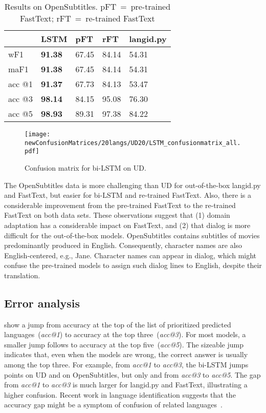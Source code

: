 \documentclass[11pt,a4paper]{article}
\newcommand{\fasttext}{FastText\xspace}
\newcommand{\langidpy}{langid.py\xspace}
\begin{document}
\begin{table}
    \begin{tabular}{|l|l|l|l|l|}
        \hline
        & \textbf{LSTM} & \textbf{pFT} & \textbf{rFT} & \textbf{\langidpy}\\ \hline
        wF1    & \textbf{91.38} & 67.45 & 84.14 & 54.31 \\ \hline
        maF1   & \textbf{91.38} & 67.45 & 84.14 & 54.31 \\ \hline
        acc @1 & \textbf{91.37} & 67.73 & 84.13 & 53.47 \\ \hline
        acc @3 & \textbf{98.14} & 84.15 & 95.08 & 76.30 \\ \hline
        acc @5 & \textbf{98.93} & 89.31 & 97.38 & 84.22 \\ \hline
    \end{tabular}
    \caption{Results on OpenSubtitles. pFT~=~pre-trained \fasttext; rFT~=~re-trained \fasttext}
    \label{tab:os20}
\end{table}


\begin{figure*}
    \centering
    \texttt{[image: newConfusionMatrices/20langs/UD20/LSTM\_confusionmatrix\_all.pdf]}
    \caption{Confusion matrix for bi-LSTM on UD.}
    \label{fig:conf_ud20_bilstm}
\end{figure*}

The OpenSubtitles data is more challenging than UD for out-of-the-box \langidpy and \fasttext, but easier for bi-LSTM and re-trained \fasttext. Also, there is a considerable improvement from the pre-trained \fasttext to the re-trained \fasttext on both data sets. These observations suggest that (1) domain adaptation has a considerable impact on \fasttext, and (2) that dialog is more difficult for the out-of-the-box models. OpenSubtitles contains subtitles of movies predominantly produced in English. Consequently, character names are also English-centered, e.g., Jane. Character names can appear in dialog, which might confuse the pre-trained models to assign such dialog lines to English, despite their translation.



\subsection{Error analysis}

 show a jump from accuracy at the top of the list of prioritized predicted languages~(\emph{acc@1}) to accuracy at the top three~(\emph{acc@3}). For most models, a smaller jump follows to accuracy at the top five~(\emph{acc@5}). The sizeable jump indicates that, even when the models are wrong, the correct answer is usually among the top three. For example, from \emph{acc@1} to \emph{acc@3}, the bi-LSTM jumps  points on UD and  on OpenSubtitles, but only  and  from \emph{acc@3} to \emph{acc@5}. The gap from \emph{acc@1} to \emph{acc@3} is much larger for \langidpy and \fasttext, illustrating a higher confusion. Recent work in language identification suggests that the accuracy gap might be a symptom of confusion of related languages~\cite{haas2020discriminating}.
\end{document}
